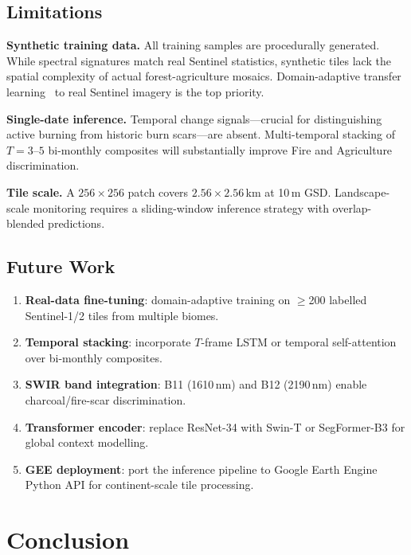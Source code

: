 \documentclass[10pt,conference]{IEEEtran}
\begin{document}
\subsection{Limitations}

\textbf{Synthetic training data.} All training samples are procedurally generated.
While spectral signatures match real Sentinel statistics, synthetic tiles lack
the spatial complexity of actual forest-agriculture mosaics. Domain-adaptive
transfer learning~\cite{ganin2016domain} to real Sentinel imagery is the
top priority.

\textbf{Single-date inference.} Temporal change signals---crucial for distinguishing
active burning from historic burn scars---are absent. Multi-temporal stacking of
$T=3$--$5$ bi-monthly composites will substantially improve Fire and Agriculture
discrimination.

\textbf{Tile scale.} A $256{\times}256$ patch covers $2.56{\times}2.56$\,km at
10\,m GSD. Landscape-scale monitoring requires a sliding-window inference strategy
with overlap-blended predictions.

\subsection{Future Work}

\begin{enumerate}[leftmargin=*,topsep=2pt,itemsep=2pt]
  \item \textbf{Real-data fine-tuning}: domain-adaptive training on $\ge$200
        labelled Sentinel-1/2 tiles from multiple biomes.
  \item \textbf{Temporal stacking}: incorporate $T$-frame LSTM or temporal
        self-attention over bi-monthly composites.
  \item \textbf{SWIR band integration}: B11 (1610\,nm) and B12 (2190\,nm)
        enable charcoal/fire-scar discrimination.
  \item \textbf{Transformer encoder}: replace ResNet-34 with Swin-T or
        SegFormer-B3 for global context modelling.
  \item \textbf{GEE deployment}: port the inference pipeline to Google Earth
        Engine Python API for continent-scale tile processing.
\end{enumerate}

\section{Conclusion}
\label{sec:conclusion}
\end{document}

